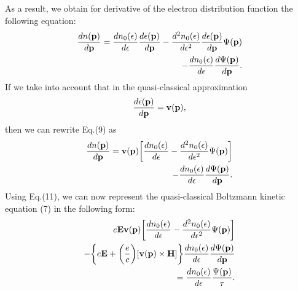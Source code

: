 \documentclass[prl,aps,showpacs,twocolumn,floatfix]{revtex4}
\begin{document}
As a result, we obtain for derivative of the electron distribution
function the following equation:
\begin{eqnarray}
\frac{d n({\bf p})}{d {\bf p}}=\frac{d n_0(\epsilon)}{d \epsilon}
\frac{d \epsilon ({\bf p})}{d {\bf p} }-\frac{d^2 n_0(\epsilon)}{d
\epsilon^2} \frac{d \epsilon ({\bf p})}{d {\bf p} }\Psi ({\bf p})
\nonumber\\
-\frac{d n_0(\epsilon)}{d \epsilon} \frac{d \Psi({\bf p})}{d \bf
p}.
\end{eqnarray}
If we take into account that in the quasi-classical approximation
\begin{equation}
\frac{d \epsilon({\bf p})}{d {\bf p}}={\bf v(p)},
\end{equation}
then we can rewrite Eq.(9) as
\begin{eqnarray}
\frac{d n({\bf p})}{d {\bf p}}= {\bf v({\bf p})} \biggl[\frac{d
n_0(\epsilon)}{d \epsilon} -\frac{d^2 n_0(\epsilon)}{d
\epsilon^2}\Psi ({\bf p}) \biggl]
\nonumber\\
-\frac{d n_0(\epsilon)}{d \epsilon} \frac{d \Psi({\bf p})}{d \bf
p}.
\end{eqnarray}
Using Eq.(11), we can now represent the quasi-classical Boltzmann
kinetic equation (7) in the following form:
\begin{eqnarray}
e{\bf E}{\bf v({\bf p})} \biggl[\frac{d n_0(\epsilon)}{d \epsilon}
-\frac{d^2 n_0(\epsilon)}{d \epsilon^2}\Psi ({\bf p}) \biggl]
\nonumber\\
-\biggl\{ e{\bf E} + \biggl( \frac{e}{c} \biggl) [{\bf v(p)}
\times {\bf H}] \biggl\}\frac{d n_0(\epsilon)}{d \epsilon} \frac{d
\Psi({\bf p})}{d \bf p}
 \nonumber\\
 = \frac{d n_0(\epsilon)}{d \epsilon} \frac{\Psi({\bf p})}{\tau}.
\end{eqnarray}
\end{document}
